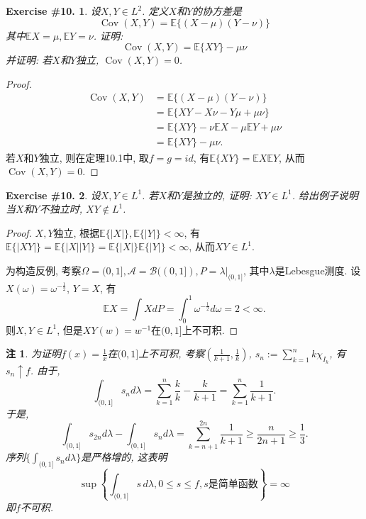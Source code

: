 \documentclass[UTF8, a4paper]{article}
\newtheorem{exercise}{Exercise \#10.}
\newtheorem*{remark}{注}
\begin{document}
\begin{framed}
\begin{exercise}
设\(X, Y \in L^2\).
定义\(X\)和\(Y\)的协方差是
$$
\operatorname{Cov}(X, Y)=\mathbb{E}\{(X-\mu)(Y-\nu)\}
$$
其中\(\mathbb{E}X = \mu, \mathbb{E}Y = \nu\).
证明:
$$
\operatorname{Cov}(X, Y)=\mathbb{E}\{X Y\}-\mu \nu
$$
并证明: 若\(X\)和\(Y\)独立, \(\operatorname{Cov}(X,Y) = 0\).
\end{exercise}
\end{framed}

\begin{proof}
$$
\begin{aligned}
    \operatorname{Cov}(X, Y)&=\mathbb{E}\{(X-\mu)(Y-\nu)\} \\
    &= \mathbb{E}\{XY - X\nu - Y\mu + \mu\nu\} \\
    &= \mathbb{E}\{XY\} - \nu \mathbb{E}X - \mu \mathbb{E}Y + \mu\nu \\
    &= \mathbb{E}\{XY\} - \mu\nu.
\end{aligned}
$$
若\(X\)和\(Y\)独立, 则在定理10.1中, 取\(f = g = id\), 有\(\mathbb{E}\{XY\} = \mathbb{E}X\mathbb{E}Y\), 从而\(\operatorname{Cov}(X,Y) = 0\).
\end{proof}



\begin{framed}
\begin{exercise}
设\(X, Y \in L^1\). 若\(X\)和\(Y\)是独立的, 证明: \(XY\in L^1\).
给出例子说明当\(X\)和\(Y\)不独立时, \(XY \notin L^1\).
\end{exercise}
\end{framed}

\begin{proof}
\(X, Y\)独立, 根据\(\mathbb{E}\{|X|\}, \mathbb{E}\{|Y|\} < \infty\), 有\(\mathbb{E}\{|XY|\} = \mathbb{E}\{|X||Y|\} = \mathbb{E}\{|X|\}\mathbb{E}\{|Y|\} < \infty\), 从而\(XY \in L^1\).

为构造反例, 考察\(\Omega = (0, 1], \mathcal{A} = \mathcal{B}((0,1]), P = \lambda|_{(0,1]}\), 其中\(\lambda\)是Lebesgue测度.
设\(X(\omega) = \omega^{-\frac{1}{2}}\), \(Y = X\), 有
$$
\mathbb{E}X = \int X dP = \int_{0}^{1} \omega^{-\frac{1}{2}} d\omega = 2 < \infty.
$$
则\(X, Y \in L^1\), 但是\(XY(w) = w^{-1}\)在\((0,1]\)上不可积.
\end{proof}

\begin{remark}
为证明\(f(x) = \frac{1}{x}\)在\((0,1]\)上不可积, 
考察\(\left(\frac{1}{k+1}, \frac{1}{k}\right)\), \(s_n := \sum_{k=1}^{n} k \chi_{I_k}\), 有\(s_n \uparrow f\).
由于, 
$$
\int_{(0, 1]} s_n d\lambda = \sum_{k=1}^{n} \frac{k}{k} - \frac{k}{k+1} = \sum_{k=1}^{n}\frac{1}{k+1}.
$$
于是, 
$$
\int_{(0, 1]} s_{2n} d\lambda - \int_{(0, 1]} s_n d\lambda = \sum_{k=n+1}^{2n} \frac{1}{k+1} \geq \frac{n}{2n+1} \geq \frac{1}{3}.
$$
序列\(\{\int_{(0, 1]} s_n d\lambda\}\)是严格增的, 这表明
$$
\sup\left\{\int_{(0,1]} s\,d\lambda, 0\leq s\leq f, s\text{是简单函数}\right\} = \infty
$$
即\(f\)不可积.
\end{remark}
\end{document}
